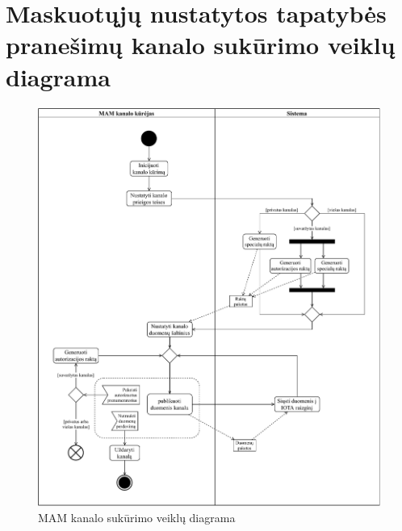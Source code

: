 \section{Maskuotųjų nustatytos tapatybės pranešimų kanalo sukūrimo veiklų diagrama}
\begin{figure}[H]
    \centering
    \includegraphics[scale=0.7]{images/ad-1}
    \caption{MAM kanalo sukūrimo veiklų diagrama}
\end{figure}

